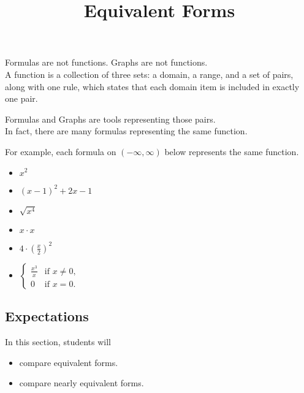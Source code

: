 \documentclass{ximera}
\title{Equivalent Forms}
\begin{document}
\begin{abstract}
\end{abstract}
\maketitle




Formulas are not functions.  Graphs are not functions. \\


A function is a collection of three sets: a domain, a range, and a set of pairs, along with one rule, which states that each domain item is included in exactly one pair.

Formulas and Graphs are tools representing those pairs.  \\


In fact, there are many formulas representing the same function.

For example, each formula on $(-\infty, \infty)$ below represents the same function.


\begin{itemize}
\item $x^2$
\item $(x - 1)^2 + 2 x - 1$
\item $\sqrt{x^4}$
\item $ x \cdot x$
\item $ 4 \cdot \left( \frac{x}{2} \right)^2$
\item $\begin{cases}
  \frac{x^3}{x} &\text{if $x \ne 0$,}\\
  0 &\text{if $x = 0$}.
\end{cases}$
\end{itemize}









\subsection{Expectations}


\begin{sectionOutcomes}
In this section, students will 

\begin{itemize}
\item compare equivalent forms.
\item compare nearly equivalent forms.
\end{itemize}
\end{sectionOutcomes}
\end{document}
